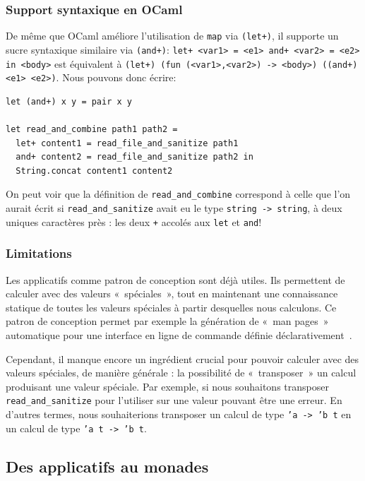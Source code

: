 \documentclass[final]{jflart}
\begin{document}
\subsubsection{Support syntaxique en OCaml}

De même que OCaml améliore l'utilisation de \texttt{map} via \texttt{(let+)}, il supporte un sucre syntaxique similaire via \texttt{(and+)}: \texttt{let+ <var1> = <e1> and+ <var2> = <e2> in <body>} est équivalent à \texttt{(let+) (fun (<var1>,<var2>) -> <body>) ((and+) <e1> <e2>)}. Nous pouvons donc écrire:

\begin{verbatim}
let (and+) x y = pair x y

let read_and_combine path1 path2 =
  let+ content1 = read_file_and_sanitize path1
  and+ content2 = read_file_and_sanitize path2 in
  String.concat content1 content2
\end{verbatim}

On peut voir que la définition de \texttt{read\_and\_combine} correspond à celle que l'on
aurait écrit si \texttt{read\_and\_sanitize} avait eu le type \texttt{string -> string}, à
deux uniques caractères près : les deux \texttt{+} accolés aux \texttt{let} et \texttt{and}!

\subsubsection{Limitations}
\label{limitations2}

Les applicatifs comme patron de conception sont déjà utiles. Ils permettent de calculer avec des valeurs «~spéciales~», tout en maintenant une connaissance statique de toutes les valeurs spéciales à partir desquelles nous calculons. Ce patron de conception permet par exemple la génération de «~man pages~» automatique pour une interface en ligne de commande définie déclarativement~\cite{cmdliner}.

Cependant, il manque encore un ingrédient crucial pour pouvoir calculer avec des valeurs spéciales, de manière générale : la possibilité de «~transposer~» un calcul produisant une valeur spéciale. Par exemple, si nous souhaitons transposer \texttt{read\_and\_sanitize} pour l'utiliser sur une valeur pouvant être une erreur. En d'autres termes, nous souhaiterions transposer un calcul de type \texttt{'a -> 'b t} en un calcul de type \texttt{'a t -> 'b t}.

\subsection{Des applicatifs au monades}
\end{document}
